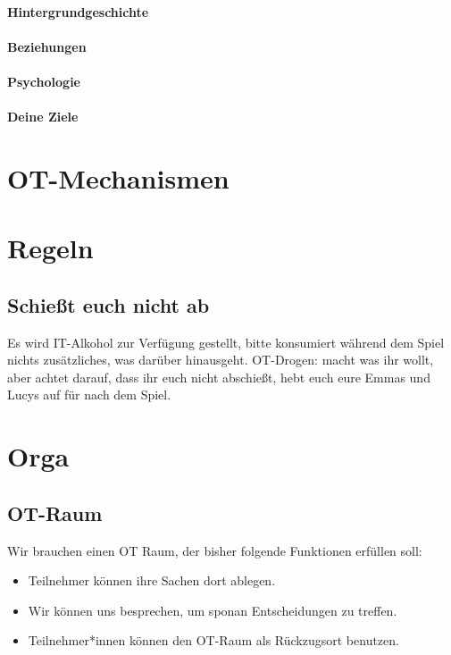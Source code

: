 \documentclass[12pt, a4paper, openany]{report}
\begin{document}
\subsubsection{Hintergrundgeschichte}
\subsubsection{Beziehungen}
\subsubsection{Psychologie}
\subsubsection{Deine Ziele}


\chapter{OT-Mechanismen}

\chapter{Regeln}
\section{Schießt euch nicht ab}
Es wird IT-Alkohol zur Verfügung gestellt, bitte konsumiert während dem Spiel nichts zusätzliches, was darüber hinausgeht.
OT-Drogen: macht was ihr wollt, aber achtet darauf, dass ihr euch nicht abschießt, hebt euch eure Emmas und Lucys auf für nach dem Spiel.

\chapter{Orga}

\section{OT-Raum}
Wir brauchen einen OT Raum, der bisher folgende Funktionen erfüllen soll:
\begin{itemize}
    \item Teilnehmer können ihre Sachen dort ablegen.
    \item Wir können uns besprechen, um sponan Entscheidungen zu treffen.
    \item Teilnehmer*innen können den OT-Raum als Rückzugsort benutzen. 
\end{itemize}
\end{document}
